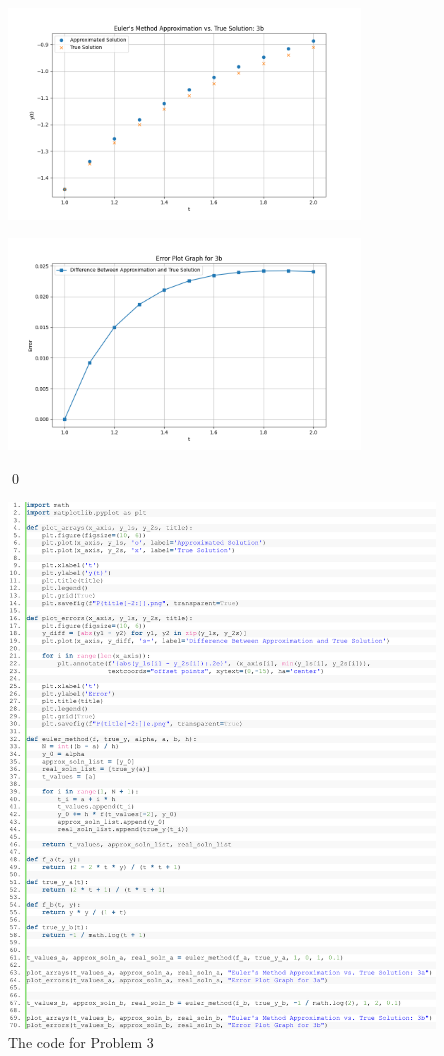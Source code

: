 \documentclass[11pt]{article}
\theoremstyle{break}
\numberwithin{equation}{theorem}
\begin{document}
\begin{enumerate}
    \begin{center}
        \includegraphics[width=0.7\textwidth]{P3b.png}
    \end{center}
    \begin{center}
        \includegraphics[width=0.7\textwidth]{P3be.png}
    \end{center} \qed
\end{enumerate}

\begin{center}
    \includegraphics[width=0.85\textwidth]{P3.png}\\
    The code for Problem 3
\end{center}
\end{document}
